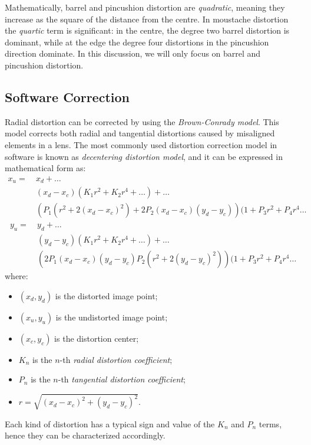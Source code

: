 \documentclass[12pt]{article}
\begin{document}
%
Mathematically, barrel and pincushion distortion are \textit{quadratic}, meaning they increase as the square of the distance from the centre. In moustache distortion the \textit{quartic} term is significant: in the centre, the degree two barrel distortion is dominant, while at the edge the degree four distortions in the pincushion direction dominate. In this discussion, we will only focus on barrel and pincushion distortion.

\subsection{Software Correction}

Radial distortion can be corrected by using the \textit{Brown-Conrady model}. This model corrects both radial and tangential distortions caused by misaligned elements in a lens. The most commonly used distortion correction model in software is known as \textit{decentering distortion model}, and it can be expressed in mathematical form as:
%
\begin{equation}
  \begin{split}
    x_u =\ & x_{d}+\dots \\
    &(x_d-x_c)(K_{1}r^{2}+K_{2}r^{4}+\dots )+\dots \\
    &(P_{1}(r^{2}+2(x_d-x_c)^{2})+2P_{2}(x_d-x_c)(y_d-y_c))(1+P_{3}r^{2}+P_{4}r^{4}\dots
  \end{split}
\end{equation}
%
\begin{equation}
  \begin{split}
    y_u =\ & y_d+\dots \\
    &(y_d-y_c)(K_{1}r^{2}+K_{2}r^{4}+\dots )+\dots \\
    &(2P_{1}(x_d-x_c)(y_d-y_c)P_{2}(r^{2}+2(y_d-y_c)^{2}))(1+P_{3}r^{2}+P_{4}r^{4}\dots
  \end{split}
\end{equation}
%
where:
%
\begin{itemize}
	\setlength\itemsep{0em}
	\item $(x_d, y_d)$ is the distorted image point;
	\item $(x_u, y_u)$ is the undistorted image point;
	\item $(x_c, y_c)$ is the distortion center;
	\item $K_n$ is the $n$-th \textit{radial distortion coefficient};
	\item $P_n$ is the $n$-th \textit{tangential distortion coefficient};
	\item $r = \sqrt{(x_d-x_c)^2+(y_d-y_c)^2}$.
\end{itemize}
%
Each kind of distortion has a typical sign and value of the $K_n$ and $P_n$ terms, hence they can be characterized accordingly.
\end{document}
